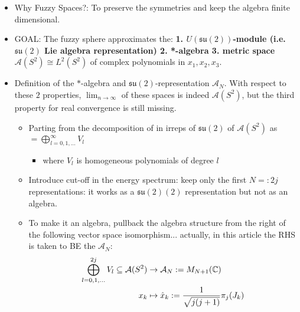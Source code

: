 \documentclass{article}
\newcommand{\alg}[1]{\ensuremath{\mathfrak{#1}}}
\newcommand{\sut}{\ensuremath{\mathfrak{su}(2)}}
\begin{document}
    \begin{itemize}
        
    \item Why Fuzzy Spaces?: To preserve the symmetries and keep the algebra finite dimensional.    
    
    \item GOAL: The fuzzy sphere approximates the: \textbf{1. $U(\alg{su}(2))$-module (i.e. $\alg{su}(2)$ Lie algebra representation) 2. *-algebra 3. metric space} $\mathcal A(S^2) \cong L^2(S^2)$ of complex polynomials in $x_1, x_2, x_3$.
        
    \item Definition of the $*$-algebra and $\alg{su(2)}$-representation $\mathcal A_N$. With respect to these $2$ properties, $\lim_{n \to \infty}$ of these spaces is indeed $\mathcal A(S^2)$, but the third property for real convergence is still missing.
    
        \begin{itemize}
            
        \item Parting from the decomposition of in irreps of $\alg{su}(2)$ of $\mathcal{A}(S^2)$ as $ = \bigoplus_{l =  0, 1, \dots}^\infty V_l$
        
            \begin{itemize}
                
            \item where $V_l$ is homogeneous polynomials of degree $l$
                
            \end{itemize}
        
        \item Introduce cut-off in the energy spectrum: keep only the first $N =: 2j$ representations: it works as a $\sut(2)$ representation but not as an algebra.
        
        \item To make it an algebra, pullback the algebra structure from the right of the following vector space isomorphism... actually, in this article the RHS is taken to BE the $\mathcal A_N$:
        \begin{align}
            \bigoplus_{l =  0, 1, \dots}^{2j} V_l \subseteq \mathcal{A}(S^2) &\to \mathcal A_N := M_{N+1}(\mathbb{C})\\
            x_k &\mapsto \hat x_k := \frac{1}{\sqrt{j(j+1)}}\pi_j(J_k)
        \end{align}
        

\end{itemize}
\end{itemize}
\end{document}

